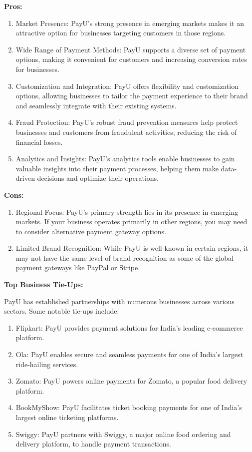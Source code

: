 \textbf{Pros:}

\begin{enumerate}
  \item Market Presence: PayU's strong presence in emerging markets makes it an attractive option for businesses targeting customers in those regions.
  \item Wide Range of Payment Methods: PayU supports a diverse set of payment options, making it convenient for customers and increasing conversion rates for businesses.
  \item Customization and Integration: PayU offers flexibility and customization options, allowing businesses to tailor the payment experience to their brand and seamlessly integrate with their existing systems.
  \item Fraud Protection: PayU's robust fraud prevention measures help protect businesses and customers from fraudulent activities, reducing the risk of financial losses.
  \item Analytics and Insights: PayU's analytics tools enable businesses to gain valuable insights into their payment processes, helping them make data-driven decisions and optimize their operations.
\end{enumerate}

\textbf{Cons:}

\begin{enumerate}
  \item Regional Focus: PayU's primary strength lies in its presence in emerging markets. If your business operates primarily in other regions, you may need to consider alternative payment gateway options.
  \item Limited Brand Recognition: While PayU is well-known in certain regions, it may not have the same level of brand recognition as some of the global payment gateways like PayPal or Stripe.
\end{enumerate}

\textbf{Top Business Tie-Ups:}

PayU has established partnerships with numerous businesses across various sectors. Some notable tie-ups include:
\begin{enumerate}
  \item Flipkart: PayU provides payment solutions for India's leading e-commerce platform.
  \item Ola: PayU enables secure and seamless payments for one of India's largest ride-hailing services.
  \item Zomato: PayU powers online payments for Zomato, a popular food delivery platform.
  \item BookMyShow: PayU facilitates ticket booking payments for one of India's largest online ticketing platforms.
  \item Swiggy: PayU partners with Swiggy, a major online food ordering and delivery platform, to handle payment transactions.
\end{enumerate}

